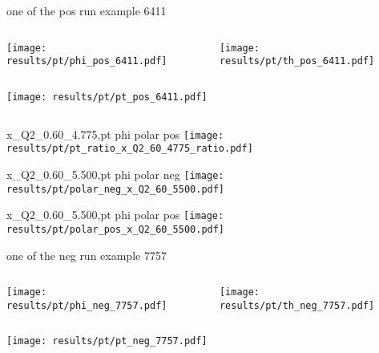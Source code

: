 \begin{frame}{one of the pos run example 6411}
\begin{columns}
\begin{column}[T]{0.5\textwidth}
\texttt{[image: results/pt/phi\_pos\_6411.pdf]}
\end{column}
\begin{column}[T]{0.5\textwidth}
\texttt{[image: results/pt/th\_pos\_6411.pdf]}
\end{column}
\end{columns}
\begin{columns}
\begin{column}[T]{0.5\textwidth}
\texttt{[image: results/pt/pt\_pos\_6411.pdf]}
\end{column}
\begin{column}[T]{0.5\textwidth}
\end{column}
\end{columns}
\end{frame}
\begin{frame}{x\_Q2\_0.60\_4.775,pt phi polar pos}
\texttt{[image: results/pt/pt\_ratio\_x\_Q2\_60\_4775\_ratio.pdf]}
\end{frame}
\begin{frame}{x\_Q2\_0.60\_5.500,pt phi polar neg}
\texttt{[image: results/pt/polar\_neg\_x\_Q2\_60\_5500.pdf]}
\end{frame}
\begin{frame}{x\_Q2\_0.60\_5.500,pt phi polar pos}
\texttt{[image: results/pt/polar\_pos\_x\_Q2\_60\_5500.pdf]}
\end{frame}
\begin{frame}{one of the neg run example 7757}
\begin{columns}
\begin{column}[T]{0.5\textwidth}
\texttt{[image: results/pt/phi\_neg\_7757.pdf]}
\end{column}
\begin{column}[T]{0.5\textwidth}
\texttt{[image: results/pt/th\_neg\_7757.pdf]}
\end{column}
\end{columns}
\texttt{[image: results/pt/pt\_neg\_7757.pdf]}
\end{frame}
